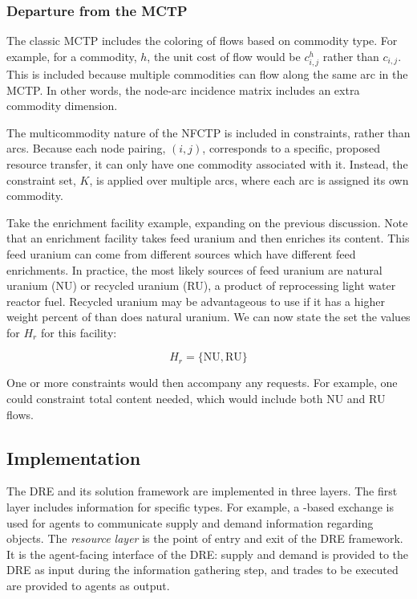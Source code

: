 \subsubsection{Departure from the MCTP}

The classic MCTP includes the coloring of flows based on commodity type. For
example, for a commodity, $h$, the unit cost of flow would be $c^h_{i,j}$ rather
than $c_{i, j}$. This is included because multiple commodities can flow along
the same arc in the MCTP. In other words, the node-arc incidence matrix includes
an extra commodity dimension. 

The multicommodity nature of the NFCTP is included in constraints, rather than
arcs. Because each node pairing, $(i, j)$, corresponds to a specific, proposed
resource transfer, it can only have one commodity associated with it. Instead,
the constraint set, $K$, is applied over multiple arcs, where each arc is
assigned its own commodity. 

Take the enrichment facility example, expanding on the previous discussion. Note
that an enrichment facility takes feed uranium and then enriches its
 content. This feed uranium can come from different sources which
have different feed enrichments. In practice, the most likely sources of feed
uranium are natural uranium (NU) or recycled uranium (RU), a product of
reprocessing light water reactor fuel. Recycled uranium may be advantageous to
use if it has a higher weight percent of  than does natural
uranium. We can now state the set the values for $H_{r}$ for this facility:

\begin{equation}\label{eqs:enr-dem-commods}
  H_{r} = \{ \mbox{NU}, \mbox{RU} \}
\end{equation}

\noindent
One or more constraints would then accompany any requests. For example, one
could constraint total  content needed, which would include both NU
and RU flows.

\subsection{Implementation}\label{abm:dre:impl}

The DRE and its solution framework are implemented in three layers. The first
layer includes information for specific  types. For example, a
-based exchange is used for agents to communicate supply and
demand information regarding  objects. The \textit{resource
  layer} is the point of entry and exit of the DRE framework. It is the
agent-facing interface of the DRE: supply and demand is provided to the DRE as
input during the information gathering step, and trades to be executed are
provided to agents as output.

